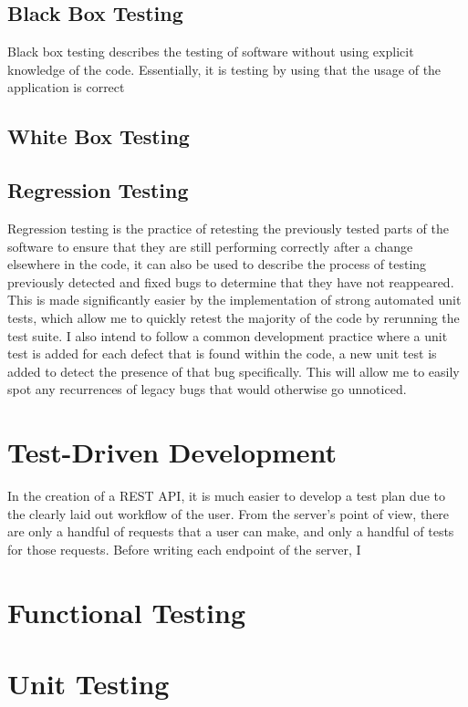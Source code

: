\subsection{Black Box Testing}
Black box testing describes the testing of software without using explicit knowledge of the code.
Essentially, it is testing by using that the usage of the application is correct

\subsection{White Box Testing}


\subsection{Regression Testing}
Regression testing is the practice of retesting the previously tested parts of the software to ensure that they are still performing correctly after a change elsewhere in the code, it can also be used to describe the process of testing previously detected and fixed bugs to determine that they have not reappeared.
This is made significantly easier by the implementation of strong automated unit tests, which allow me to quickly retest the majority of the code by rerunning the test suite.
I also intend to follow a common development practice where a unit test is added for each defect that is found within the code, a new unit test is added to detect the presence of that bug specifically. 
This will allow me to easily spot any recurrences of legacy bugs that would otherwise go unnoticed.

\section{Test-Driven Development}
In the creation of a REST API, it is much easier to develop a test plan due to the clearly laid out workflow of the user. From the server's point of view, there are only a handful of requests that a user can make, and only a handful of tests for those requests. Before writing each endpoint of the server, I 

\section{Functional Testing}

\section{Unit Testing}

